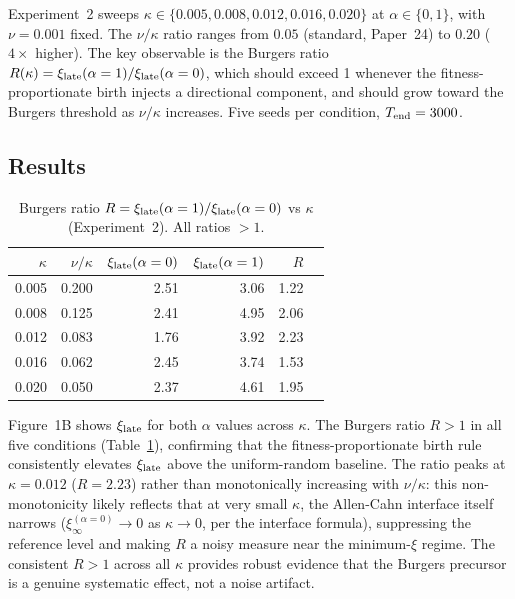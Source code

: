 \documentclass[11pt]{article}
\begin{document}
Experiment~2 sweeps $\kappa \in \{0.005, 0.008, 0.012, 0.016, 0.020\}$
at $\alpha \in \{0, 1\}$, with $\nu=0.001$ fixed.
The $\nu/\kappa$ ratio ranges from $0.05$ (standard, Paper~24) to $0.20$
($4\times$ higher).
The key observable is the Burgers ratio
$R(\kappa) = \xi_{\rm late}(\alpha=1)/\xi_{\rm late}(\alpha=0)$,
which should exceed 1 whenever the fitness-proportionate birth injects
a directional component, and should grow toward the Burgers threshold
as $\nu/\kappa$ increases.
Five seeds per condition, $T_{\rm end}=3000$.

\subsection{Results}

\begin{table}[ht]
\centering
\caption{Burgers ratio $R = \xi_{\rm late}(\alpha=1)/\xi_{\rm late}(\alpha=0)$
vs $\kappa$ (Experiment~2). All ratios $> 1$.}
\label{tab:burgers_ratio}
\begin{tabular}{rrrrrr}
\toprule
$\kappa$ & $\nu/\kappa$ & $\xi_{\rm late}(\alpha=0)$ &
$\xi_{\rm late}(\alpha=1)$ & $R$ \\
\midrule
0.005  & 0.200 & 2.51 & 3.06 & 1.22 \\
0.008  & 0.125 & 2.41 & 4.95 & 2.06 \\
0.012  & 0.083 & 1.76 & 3.92 & 2.23 \\
0.016  & 0.062 & 2.45 & 3.74 & 1.53 \\
0.020  & 0.050 & 2.37 & 4.61 & 1.95 \\
\bottomrule
\end{tabular}
\end{table}

Figure~1B shows $\xi_{\rm late}$ for both $\alpha$ values across $\kappa$.
The Burgers ratio $R > 1$ in all five conditions (Table~\ref{tab:burgers_ratio}),
confirming that the fitness-proportionate birth rule consistently elevates
$\xi_{\rm late}$ above the uniform-random baseline.
The ratio peaks at $\kappa=0.012$ ($R=2.23$) rather than monotonically
increasing with $\nu/\kappa$: this non-monotonicity likely reflects that
at very small $\kappa$, the Allen-Cahn interface itself narrows
($\xi_\infty^{(\alpha=0)} \to 0$ as $\kappa \to 0$, per the interface formula),
suppressing the reference level and making $R$ a noisy measure near the
minimum-$\xi$ regime.
The consistent $R > 1$ across all $\kappa$ provides robust evidence
that the Burgers precursor is a genuine systematic effect, not a
noise artifact.
\end{document}
